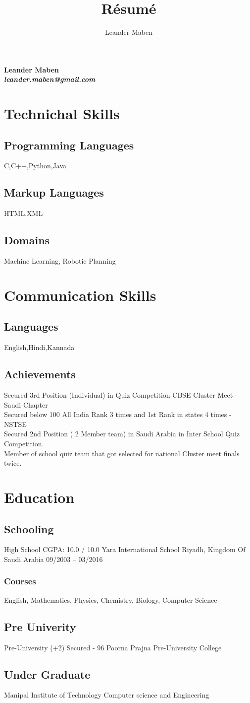 \documentclass[a4paper,11pt]{article}
\title{R\'esum\'e}
\author{Leander Maben}
\makeatletter
\renewcommand{\maketitle}{
\begin{center}
  \huge\bfseries{Leander Maben}\\ 
  \vspace{.25em}
  \large\emph{leander.maben@gmail.com}
\end{center}
}
\makeatother
\begin{document}
\maketitle

\section{Technichal Skills}
\subsection{Programming Languages}
C,C++,Python,Java
\subsection{Markup Languages}
HTML,XML
\subsection{Domains}
Machine Learning, Robotic Planning
\section{Communication Skills}
\subsection{Languages}
English,Hindi,Kannada
\subsection{Achievements}
Secured 3rd Position (Individual) in Quiz Competition CBSE Cluster Meet - Saudi Chapter\\
Secured below 100 All India Rank 3 times and 1st Rank in states 4 times - NSTSE\\
Secured 2nd Position ( 2 Member team) in Saudi Arabia in Inter School Quiz Competition.\\
Member of school quiz team that got selected for national Cluster meet finals twice.\\ 
\section{Education}
\subsection{Schooling}
High School CGPA: 10.0 / 10.0
Yara International School
Riyadh, Kingdom Of Saudi
Arabia
09/2003 – 03/2016
\subsubsection{Courses}
English, Mathematics, Physics, Chemistry, Biology, Computer Science
\subsection{Pre Univerity}
Pre-University (+2) Secured - 96%
Poorna Prajna Pre-University College
\subsection{Under Graduate}
Manipal Institute of Technology
Computer science and Engineering
\end{document}
